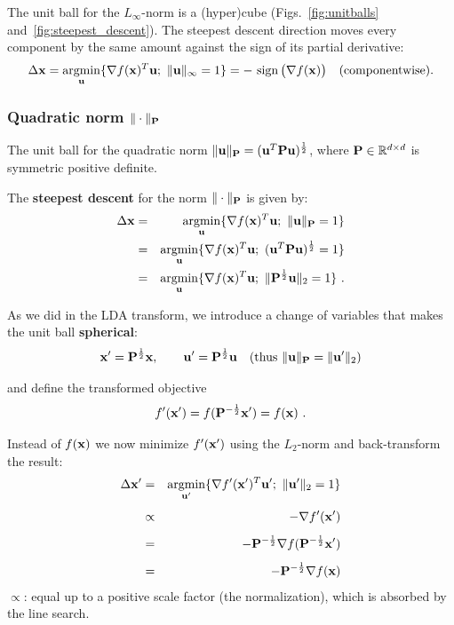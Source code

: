   The unit ball for the $L_\infty$-norm is a (hyper)cube (Figs.~\ref{fig:unitballs} and~\ref{fig:steepest_descent}). The steepest descent direction moves every component by the same amount against the sign of its partial derivative:
  \begin{displaymath}
    \Delta \bm{\mathrm{x}} = \operatorname*{argmin}_{\bm{\mathrm{u}}} \{\nabla f(\bm{\mathrm{x}})^T \bm{\mathrm{u}} ; \ \| \bm{\mathrm{u}}\|_\infty = 1\}
    = -\,\operatorname{sign}\big(\nabla f(\bm{\mathrm{x}})\big) \quad\text{(componentwise)}.
  \end{displaymath}
  
\subsubsection{Quadratic norm \texorpdfstring{$\|\cdot\|_{\mathbf{P}}$}{quadratic norm}}

The unit ball for the quadratic norm $\|\bm{\mathrm{u}}\|_{\mathbf{P}} = (\bm{\mathrm{u}}^T\mathbf{P}\bm{\mathrm{u}})^{\frac{1}{2}}$, where $\mathbf{P}\in\mathbb{R}^{d\times d}$ is symmetric positive definite.

The \textbf{steepest descent} for the norm $\|\cdot\|_{\mathbf{P}}$ is given by:
\begin{eqnarray*}
  \Delta \bm{\mathrm{x}}
    &=& \operatorname*{argmin}_{\bm{\mathrm{u}}} \{\nabla f(\bm{\mathrm{x}})^T \bm{\mathrm{u}} ; \ \| \bm{\mathrm{u}}\|_{\mathbf{P}} = 1\} \\   
    &=& \operatorname*{argmin}_{\bm{\mathrm{u}}} \{\nabla f(\bm{\mathrm{x}})^T \bm{\mathrm{u}} ;\  (\bm{\mathrm{u}}^T{\mathbf{P}}\bm{\mathrm{u}})^{\frac{1}{2}} = 1\} \\   
    &=& \operatorname*{argmin}_{\bm{\mathrm{u}}} \{\nabla f(\bm{\mathrm{x}})^T \bm{\mathrm{u}} ;\ \| {\mathbf{P}}^{\frac{1}{2}} \bm{\mathrm{u}}\|_2 = 1\}~.
\end{eqnarray*}

As we did in the LDA transform, we introduce a change of variables that makes the unit ball \textbf{spherical}:
\begin{displaymath}
  \bm{\mathrm{x}}' = {\mathbf{P}}^{\frac{1}{2}} \bm{\mathrm{x}}, \qquad \bm{\mathrm{u}}' = {\mathbf{P}}^{\frac{1}{2}} \bm{\mathrm{u}} \quad (\mbox{thus } \|\bm{\mathrm{u}}\|_{\mathbf{P}} = \|\bm{\mathrm{u}}'\|_2)
\end{displaymath}

and define the transformed objective
\begin{displaymath}
  f'(\bm{\mathrm{x}}') = f({\mathbf{P}}^{-\frac{1}{2}}\bm{\mathrm{x}}') = f(\bm{\mathrm{x}})~.
\end{displaymath}

Instead of $f(\bm{\mathrm{x}})$ we now minimize $f'(\bm{\mathrm{x}}')$ using the $L_2$-norm and back-transform the result:
\begin{eqnarray*}
  \Delta \vect x'
    &=& \argmin_{\vect u'} \{\nabla f'(\vect x')^T \vect u' ; \ \| \vect u'\|_{2} = 1\} \\[.15cm]
    &\propto& -\nabla f'(\vect x') \\[.15cm]
    &=& -\mat P^{-\frac{1}{2}}\nabla f({\mat P}^{-\frac{1}{2}}\vect x') \\[.15cm]
    &=& - {\mat P}^{-\frac{1}{2}}\nabla f(\vect x)
\end{eqnarray*}
{\small $\propto$: equal up to a positive scale factor (the normalization), which is absorbed by the line search.}

